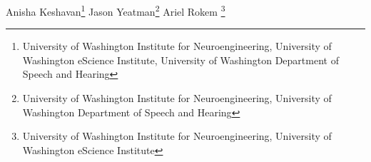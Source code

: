 \iflatexml
Anisha Keshavan\footnote[1,2,3]{University of Washington Institute for Neuroengineering, University of Washington eScience Institute, University of Washington Department of Speech and Hearing}
Jason Yeatman\footnote[1,3]{University of Washington Institute for Neuroengineering, University of Washington Department of Speech and Hearing}
Ariel Rokem \footnote[1,2] {University of Washington Institute for Neuroengineering, University of Washington eScience Institute}

\else %

\author[l1,l2,l3]{Anisha Keshavan}

\author[l1,l3]{Jason Yeatman}

\author[l1,l2]{Ariel Rokem}


\address[l1]{University of Washington Institute for Neuroengineering, Seattle, WA}
\address[l2]{University of Washington eScience Institute, Seattle, WA}
\address[l3]{University of Washington Deparment of Speech and Hearing, Seattle, WA}

\fi